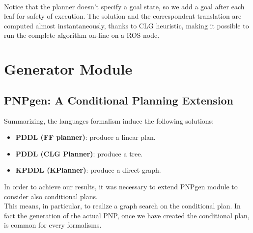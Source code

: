 \documentclass[pdftex,12pt,a4paper]{report}
\begin{document}
\\
\newline
\noindent Notice that the planner doesn't specify a goal state, so we add a goal after each leaf for safety of execution.
The solution and the correspondent translation are computed almost instantaneously, thanks to CLG heuristic, making it possible to run the complete algorithm on-line on a ROS node. 

\section{Generator Module}\label{sec:generator}
\subsection{PNPgen: A Conditional Planning Extension}
Summarizing, the languages formalism induce the following solutions:
\begin{itemize}
\item \textbf{PDDL (FF planner)}: produce a linear plan.
\item \textbf{PDDL (CLG Planner)}: produce a tree. 
\item \textbf{KPDDL (KPlanner)}: produce a direct graph.
\end{itemize}
In order to achieve our results, it was necessary to extend PNPgen module to consider also conditional plans.\\
This means, in particular, to realize a graph search on the conditional plan. In fact the generation of the actual PNP, once we have created the conditional plan, is common for every formalisms.\\
\end{document}
